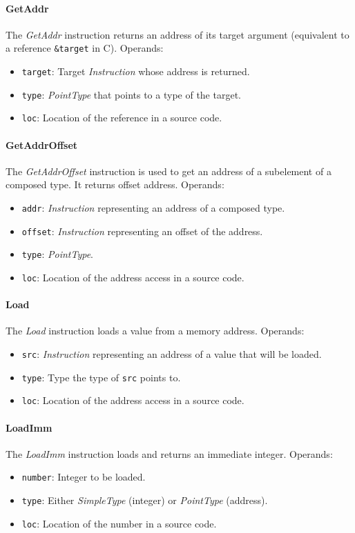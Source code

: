 \documentclass[thesis=M,english]{FITthesis}[2019/12/23]
\begin{document}
\paragraph*{GetAddr} The \emph{GetAddr} instruction returns an address of its target argument (equivalent to a reference \texttt{\&target} in C). Operands:
\begin{itemize}
    \item \texttt{target}: Target \emph{Instruction} whose address is returned.
    \item \texttt{type}: \emph{PointType} that points to a type of the target.
    \item \texttt{loc}: Location of the reference in a source code.
\end{itemize}

\paragraph*{GetAddrOffset} The \emph{GetAddrOffset} instruction is used to get an address of a subelement of a composed type. It returns offset address. Operands:
\begin{itemize}
    \item \texttt{addr}: \emph{Instruction} representing an address of a composed type.
    \item \texttt{offset}: \emph{Instruction} representing an offset of the address.
    \item \texttt{type}: \emph{PointType}.
    \item \texttt{loc}: Location of the address access in a source code.
\end{itemize}

\paragraph*{Load} The \emph{Load} instruction loads a value from a memory address. Operands:
\begin{itemize}
    \item \texttt{src}: \emph{Instruction} representing an address of a value that will be loaded.
    \item \texttt{type}: Type the type of \texttt{src} points to.
    \item \texttt{loc}: Location of the address access in a source code.
\end{itemize}

\paragraph*{LoadImm} The \emph{LoadImm} instruction loads and returns an immediate integer. Operands:
\begin{itemize}
    \item \texttt{number}: Integer to be loaded.
    \item \texttt{type}: Either \emph{SimpleType} (integer) or \emph{PointType} (address).
    \item \texttt{loc}: Location of the number in a source code.
\end{itemize}
\end{document}
